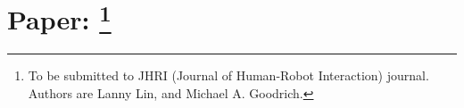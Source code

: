 \chapter[Paper: ]{Paper: \footnote {To be submitted to JHRI (Journal of Human-Robot Interaction) journal. Authors are Lanny Lin, and Michael A. Goodrich.}}
\label{chap:JHRI2014}